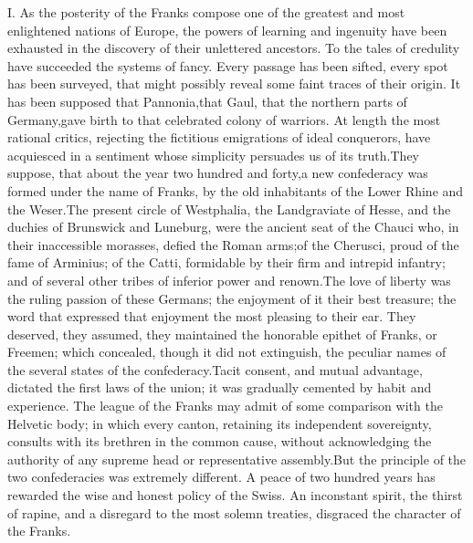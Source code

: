 


I. As the posterity of the Franks compose one of the greatest and
most enlightened nations of Europe, the powers of learning and
ingenuity have been exhausted in the discovery of their
unlettered ancestors. To the tales of credulity have succeeded
the systems of fancy. Every passage has been sifted, every spot
has been surveyed, that might possibly reveal some faint traces
of their origin. It has been supposed that Pannonia,\footnotemark[67] that
Gaul, that the northern parts of Germany,\footnotemark[68] gave birth to that
celebrated colony of warriors. At length the most rational
critics, rejecting the fictitious emigrations of ideal
conquerors, have acquiesced in a sentiment whose simplicity
persuades us of its truth.\footnotemark[69] They suppose, that about the year
two hundred and forty,\footnotemark[70] a new confederacy was formed under the
name of Franks, by the old inhabitants of the Lower Rhine and the
Weser.\footnotemark[701] The present circle of Westphalia, the Landgraviate of
Hesse, and the duchies of Brunswick and Luneburg, were the
ancient seat of the Chauci who, in their inaccessible morasses,
defied the Roman arms;\footnotemark[71] of the Cherusci, proud of the fame of
Arminius; of the Catti, formidable by their firm and intrepid
infantry; and of several other tribes of inferior power and
renown.\footnotemark[72] The love of liberty was the ruling passion of these
Germans; the enjoyment of it their best treasure; the word that
expressed that enjoyment the most pleasing to their ear. They
deserved, they assumed, they maintained the honorable epithet of
Franks, or Freemen; which concealed, though it did not
extinguish, the peculiar names of the several states of the
confederacy.\footnotemark[73] Tacit consent, and mutual advantage, dictated the
first laws of the union; it was gradually cemented by habit and
experience. The league of the Franks may admit of some comparison
with the Helvetic body; in which every canton, retaining its
independent sovereignty, consults with its brethren in the common
cause, without acknowledging the authority of any supreme head or
representative assembly.\footnotemark[74] But the principle of the two
confederacies was extremely different. A peace of two hundred
years has rewarded the wise and honest policy of the Swiss. An
inconstant spirit, the thirst of rapine, and a disregard to the
most solemn treaties, disgraced the character of the Franks.

